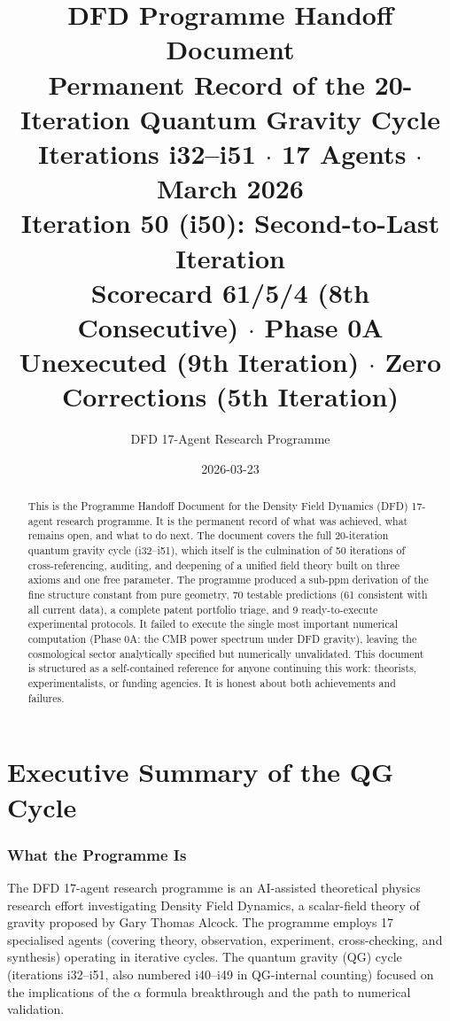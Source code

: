 \documentclass[11pt,a4paper]{article}
\title{\Huge DFD Programme Handoff Document\\[12pt]
\Large Permanent Record of the 20-Iteration Quantum Gravity Cycle\\[6pt]
\large Iterations i32--i51 $\cdot$ 17 Agents $\cdot$ March 2026\\[6pt]
\normalsize \textbf{Iteration 50 (i50): Second-to-Last Iteration}\\[3pt]
\normalsize Scorecard 61/5/4 (8th Consecutive) $\cdot$ Phase 0A Unexecuted (9th Iteration) $\cdot$ Zero Corrections (5th Iteration)}
\author{DFD 17-Agent Research Programme}
\date{2026-03-23}
\begin{document}
\maketitle

\begin{abstract}
This is the Programme Handoff Document for the Density Field Dynamics (DFD) 17-agent research programme. It is the permanent record of what was achieved, what remains open, and what to do next. The document covers the full 20-iteration quantum gravity cycle (i32--i51), which itself is the culmination of 50 iterations of cross-referencing, auditing, and deepening of a unified field theory built on three axioms and one free parameter. The programme produced a sub-ppm derivation of the fine structure constant from pure geometry, 70 testable predictions (61 consistent with all current data), a complete patent portfolio triage, and 9 ready-to-execute experimental protocols. It failed to execute the single most important numerical computation (Phase 0A: the CMB power spectrum under DFD gravity), leaving the cosmological sector analytically specified but numerically unvalidated. This document is structured as a self-contained reference for anyone continuing this work: theorists, experimentalists, or funding agencies. It is honest about both achievements and failures.
\end{abstract}

\tableofcontents
\newpage


\part{Executive Summary of the QG Cycle}
\label{part:executive}

\section{What the Programme Is}

The DFD 17-agent research programme is an AI-assisted theoretical physics research effort investigating Density Field Dynamics, a scalar-field theory of gravity proposed by Gary Thomas Alcock. The programme employs 17 specialised agents (covering theory, observation, experiment, cross-checking, and synthesis) operating in iterative cycles. The quantum gravity (QG) cycle (iterations i32--i51, also numbered i40--i49 in QG-internal counting) focused on the implications of the $\alpha$ formula breakthrough and the path to numerical validation.
\end{document}
